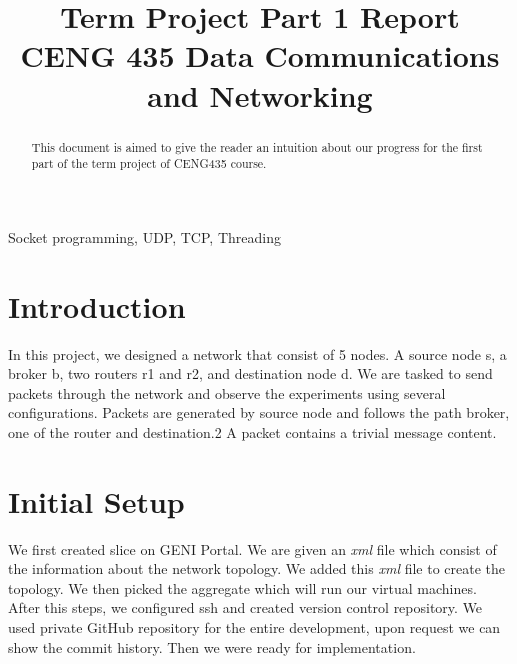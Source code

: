 \documentclass[conference]{IEEEtran}
\begin{document}
\title{Term Project Part 1 Report\\
{\footnotesize CENG 435 Data Communications and Networking}
}

\author{
\and
{}
}

\maketitle

\begin{abstract}
This document is aimed to give the reader an intuition about our progress for the first part of the term project of CENG435 course.
\end{abstract}

\begin{IEEEkeywords}
Socket programming, UDP, TCP, Threading
\end{IEEEkeywords}

\section{Introduction}
In this project, we designed a network that consist of 5 nodes. A source node s, a broker b, two routers r1 and r2, and destination node d. We are tasked to send packets through the network and observe the experiments using several configurations. Packets are generated by source node and follows the path broker, one of the router and destination.2 A packet contains a trivial message content.

\section{Initial Setup}
We first created slice on GENI Portal. We are given an \textit{xml} file which consist of the information about the network topology. We added this \textit{xml} file to create the topology. We then picked the aggregate which will run our virtual machines. After this steps, we configured ssh and created version control repository. We used private GitHub repository for the entire development, upon request we can show the commit history. Then we were ready for implementation. 
\end{document}

